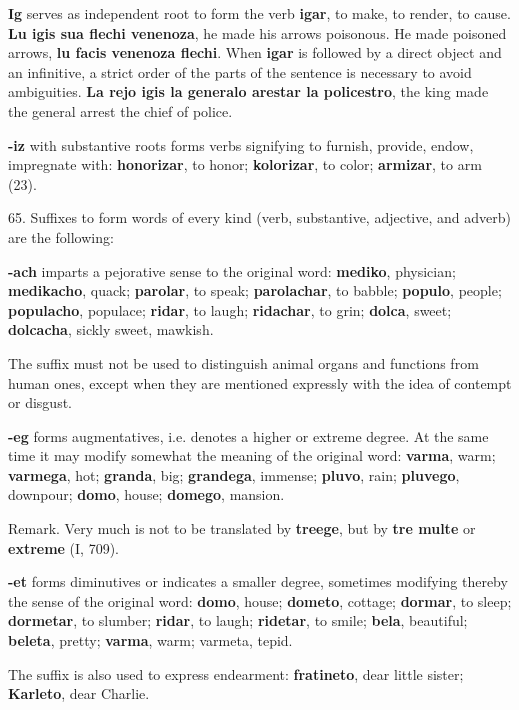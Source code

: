 \textbf{Ig} serves as independent root to form the verb \textbf{igar}, to make, to render, to cause. \textbf{Lu igis sua flechi venenoza}, he made his arrows poisonous. He made poisoned arrows, \textbf{lu facis venenoza flechi}. When \textbf{igar} is followed by a direct object and an infinitive, a strict order of the parts of the sentence is necessary to avoid ambiguities. \textbf{La rejo igis la generalo arestar la policestro}, the king made the general arrest the chief of police. 

\textbf{-iz} with substantive roots forms verbs signifying to furnish, provide, endow, impregnate with: \textbf{honorizar}, to honor; \textbf{kolorizar}, to color; \textbf{armizar}, to arm (23). 

65. Suffixes to form words of every kind (verb, substantive, adjective, and adverb) are the following: 

\textbf{-ach} imparts a pejorative sense to the original word: \textbf{mediko}, physician; \textbf{medikacho}, quack; \textbf{parolar}, to speak; \textbf{parolachar}, to babble; \textbf{populo}, people; \textbf{populacho}, populace; \textbf{ridar}, to laugh; \textbf{ridachar}, to grin; \textbf{dolca}, sweet; \textbf{dolcacha}, sickly sweet, mawkish. 

The suffix must not be used to distinguish animal organs and functions from human ones, except when they are mentioned expressly with the idea of contempt or disgust. 

\textbf{-eg} forms augmentatives, i.e. denotes a higher or extreme degree. At the same time it may modify somewhat the meaning of the original word: \textbf{varma}, warm; \textbf{varmega}, hot; \textbf{granda}, big; \textbf{grandega}, immense; \textbf{pluvo}, rain; \textbf{pluvego}, downpour; \textbf{domo}, house; \textbf{domego}, mansion. 

\small Remark. Very much is not to be translated by \textbf{treege}, but by \textbf{tre multe} or \textbf{extreme} (I, 709). \normalsize

\textbf{-et} forms diminutives or indicates a smaller degree, sometimes modifying thereby the sense of the original word: \textbf{domo}, house; \textbf{dometo}, cottage; \textbf{dormar}, to sleep; \textbf{dormetar}, to slumber; \textbf{ridar}, to laugh; \textbf{ridetar}, to smile; \textbf{bela}, beautiful; \textbf{beleta}, pretty; \textbf{varma}, warm; varmeta, tepid. 

The suffix is also used to express endearment: \textbf{fratineto}, dear little sister; \textbf{Karleto}, dear Charlie. 

